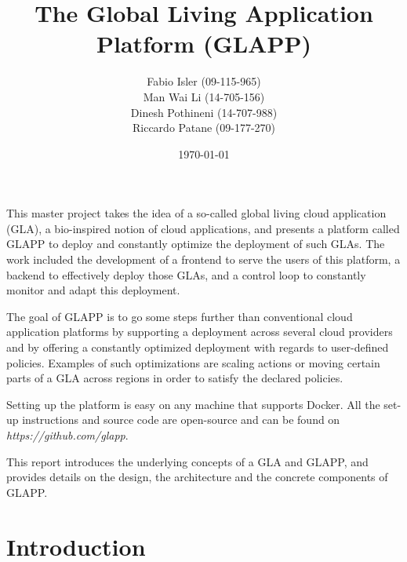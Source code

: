 \documentclass{seal_thesis}
\date{\today}
\title{The Global Living Application Platform (GLAPP)}
\subtitle{}
\author{
Fabio Isler \textmd{(09-115-965)} \\
Man Wai Li \textmd{(14-705-156)} \\
Dinesh Pothineni \textmd{(14-707-988)} \\
Riccardo Patane \textmd{(09-177-270)}}
\begin{document}
\maketitle

\abstract
This master project takes the idea of a so-called global living cloud application (GLA), a bio-inspired notion of cloud applications, and presents a platform called GLAPP to deploy and constantly optimize the deployment of such GLAs. The work included the development of a frontend to serve the users of this platform, a backend to effectively deploy those GLAs, and a control loop to constantly monitor and adapt this deployment.

The goal of GLAPP is to go some steps further than conventional cloud application platforms by supporting a deployment across several cloud providers and by offering a constantly optimized deployment with regards to user-defined policies. Examples of such optimizations are scaling actions or moving certain parts of a GLA across regions in order to satisfy the declared policies.

Setting up the platform is easy on any machine that supports Docker. All the set-up instructions and source code are open-source and can be found on \textit{https://github.com/glapp}.

This report introduces the underlying concepts of a GLA and GLAPP, and provides details on the design, the architecture and the concrete components of GLAPP.


\chapter{Introduction}\label{ch:introduction}
\end{document}
